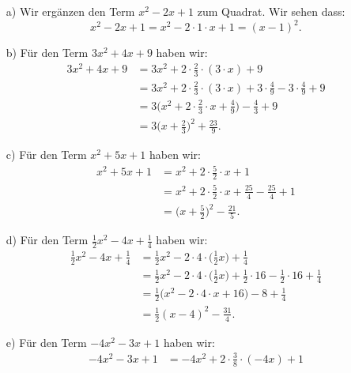\documentclass[12pt]{article}
\begin{document}
\begin{solution}
\begin{enumerate}
\item[a)] Wir ergänzen den Term $x^{2}-2x+1$ zum Quadrat. Wir sehen dass:
$$x^{2}-2x+1=x^{2}-2\cdot 1\cdot x+1=(x-1)^{2}.$$
\item[b)] Für den Term $3x^{2}+4x+9$ haben wir:
\begin{equation*}
\begin{split}
3x^{2}+4x+9 & = 3x^{2}+2\cdot \frac{2}{3}\cdot (3\cdot x)+9\\
					 & = 3x^{2}+2\cdot \frac{2}{3}\cdot (3\cdot x)+3\cdot \frac{4}{9}-3\cdot \frac{4}{9}+9\\
					 & = 3\bigg(x^{2}+2\cdot \frac{2}{3}\cdot x+\frac{4}{9}\bigg)-\frac{4}{3}+9\\
					 & = 3\bigg(x+\frac{2}{3}\bigg)^{2}+\frac{23}{9}.
\end{split}
\end{equation*}
\item[c)] Für den Term $x^{2}+5x+1$ haben wir:
\begin{equation*}
\begin{split}
x^{2}+5x+1& = x^{2}+2\cdot \frac{5}{2}\cdot x+1\\
					 & = x^{2}+2\cdot \frac{5}{2}\cdot x+\frac{25}{4}-\frac{25}{4}+1\\
					 & = \bigg(x+\frac{5}{2}\bigg)^2-\frac{21}{5}.
\end{split}
\end{equation*}
\item[d)] Für den Term $\frac{1}{2}x^{2}-4x+\frac{1}{4}$ haben wir:
\begin{equation*}
\begin{split}
\frac{1}{2}x^{2}-4x+\frac{1}{4} & =\frac{1}{2} x^{2}-2\cdot 4\cdot \bigg(\frac{1}{2}x\bigg)+\frac{1}{4}\\
					 & = \frac{1}{2}x^{2}-2\cdot 4\cdot \bigg(\frac{1}{2}x\bigg)+\frac{1}{2}\cdot 16-\frac{1}{2}\cdot 16+\frac{1}{4}\\
					 & = \frac{1}{2}\bigg(x^{2}-2\cdot 4\cdot x+16\bigg)-8+\frac{1}{4}\\
					 & = \frac{1}{2}(x-4)^{2}-\frac{31}{4}.
\end{split}
\end{equation*}
\item[e)] Für den Term $-4x^{2}-3x+1$ haben wir:
\begin{equation*}
\begin{split}
-4x^{2}-3x+1 & = -4x^{2}+2\cdot \frac{3}{8}\cdot (-4x)+1\\

\end{split}
\end{equation*}
\end{enumerate}
\end{solution}
\end{document}
